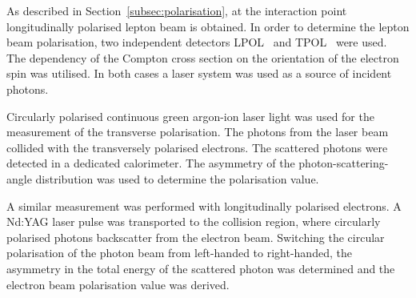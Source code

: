 As described in Section~\ref{subsec:polarisation}, at the interaction point longitudinally polarised lepton beam is obtained. In order to determine the lepton beam polarisation, two independent detectors LPOL~\cite{nim:a479:334} and TPOL~\cite{nim:a329:79} were used.
The dependency of the Compton cross section on the orientation of the electron spin was utilised. In both cases a laser system was used as a source of incident photons.

Circularly polarised continuous green argon-ion laser light was used for the measurement of the transverse polarisation. The photons from the laser beam collided with the transversely polarised electrons. The scattered photons were detected in a dedicated calorimeter. The asymmetry of the photon-scattering-angle distribution was used to determine the polarisation value.

A similar measurement was performed with longitudinally polarised electrons. A Nd:YAG laser pulse was transported to the collision region, where circularly polarised photons backscatter from the electron beam. Switching the circular polarisation of the photon beam from left-handed to right-handed, the asymmetry in the total energy of the scattered photon was determined and the electron beam polarisation value was derived.
